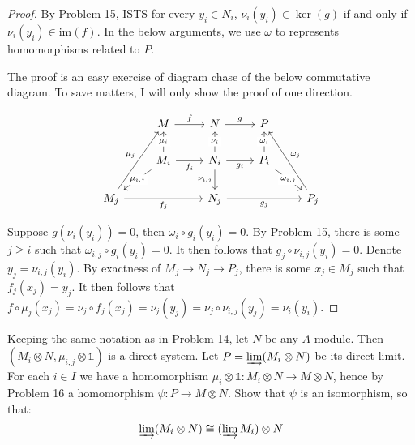 \documentclass{solution}
\begin{document}
\begin{proof}
    By Problem 15, ISTS for every $y_i \in N_i$, $\nu_i(y_i) \in \ker (g)$ if and only if $\nu_i(y_i) \in \mathrm{im}(f)$. In the below arguments, we use $\omega$ to represents homomorphisms related to $P$.

    The proof is an easy exercise of diagram chase of the below commutative diagram. To save matters, I will only show the proof of one direction.

    \[\begin{tikzcd}
        & M & N & P \\
        & {M_i} & {N_i} & {P_i} \\
        {M_j} && {N_j} && {P_j}
        \arrow["f", from=1-2, to=1-3]
        \arrow["g", from=1-3, to=1-4]
        \arrow["{\mu_i}"{description}, from=2-2, to=1-2]
        \arrow["{f_i}"', from=2-2, to=2-3]
        \arrow["{\mu_{i, j}}"{description}, from=2-2, to=3-1]
        \arrow["{\nu_i}"{description}, from=2-3, to=1-3]
        \arrow["{g_i}"', from=2-3, to=2-4]
        \arrow["{\nu_{i, j}}"', from=2-3, to=3-3]
        \arrow["{\omega_i}"{description}, from=2-4, to=1-4]
        \arrow["{\omega_{i, j}}"{description}, from=2-4, to=3-5]
        \arrow["{\mu_j}", from=3-1, to=1-2]
        \arrow["{f_j}"', from=3-1, to=3-3]
        \arrow["{g_j}"', from=3-3, to=3-5]
        \arrow["{\omega_j}"', from=3-5, to=1-4]
    \end{tikzcd}\]

    Suppose $g (\nu_i(y_i)) = 0$, then $\omega_i \circ g_i(y_i) = 0$. By Problem 15, there is some $j \ge i$ such that $\omega_{i, j} \circ g_i(y_i) = 0$. It then follows that $g_j \circ \nu_{i, j}(y_i) = 0$. Denote $y_j = \nu_{i, j}(y_i)$. By exactness of $M_j \rightarrow N_j \rightarrow P_j$, there is some $x_j \in M_j$ such that $f_j(x_j) = y_j$. It then follows that $f \circ \mu_j(x_j) = \nu_j \circ f_j(x_j) = \nu_j (y_j) = \nu_j \circ \nu_{i, j}(y_j) = \nu_i(y_i)$.
\end{proof}

\begin{problem}
    Keeping the same notation as in Problem 14, let $N$ be any $A$-module. Then $(M_i \otimes N, \mu_{i, j} \otimes \mathds{1})$ is a direct system. Let $P = \varinjlim (M_i \otimes N)$ be its direct limit. For each $i \in I$ we have a homomorphism $\mu_i \otimes \mathds{1}: M_i \otimes N \rightarrow M \otimes N$, hence by Problem 16 a homomorphism $\psi: P \rightarrow M \otimes N$. Show that $\psi$ is an isomorphism, so that:
    $$\varinjlim (M_i \otimes N) \cong (\varinjlim M_i) \otimes N$$
\end{problem}
\end{document}
